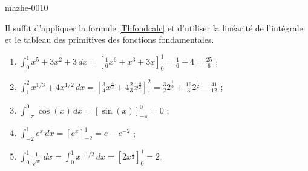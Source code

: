 
\begin{corrige}{mazhe-0010}

    Il suffit d'appliquer la formule \eqref{Thfondcalc} et d'utiliser la linéarité de l'intégrale et le tableau des primitives des fonctions fondamentales. 
  \begin{enumerate}
  \item $\displaystyle \int_0^1 x^5+3x^2+3 \, dx = \left[\frac{1}{6} x^6 + x^3 +3x \right]_0^1 = \frac{1}{6}+4 = \frac{25}{6} $ ;
  \item $\displaystyle \int_1^2 x^{1/3}+4x^{1/2} \, dx  = \left[\frac{3}{4} x^{\frac{4}{3}} + 4 \frac{2}{3} x^{\frac{3}{2}} \right]_1^2 =\frac{3}{2} 2^{\frac{1}{3}} + \frac{16}{3} 2^{\frac{1}{2}} - \frac{41}{12} $ ;
  \item $\displaystyle \int_{-\pi}^{0} \cos(x) \, dx  = \left[\sin(x) \right]_{-\pi}^0  = 0$ ;
  \item $\displaystyle \int_{-2}^{1} e^x \, dx = \left[e^x \right]_{-2}^{1} = e - e^{-2} $ ;
  \item $\displaystyle \int_{0}^{1} \frac{1}{\sqrt{x}} \, dx =\int_{0}^{1} x^{-1/2} \, dx  = \left[2x^{\frac{1}{2}}  \right]_0^1  = 2$.
  \end{enumerate}
\end{corrige}
